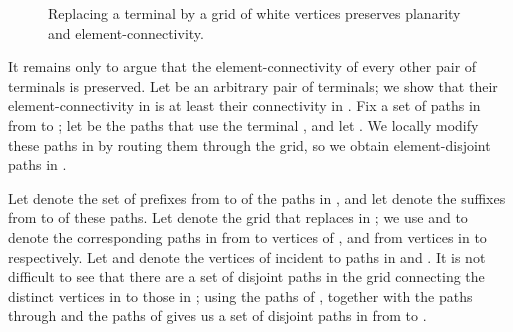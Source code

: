 \documentclass[11pt]{article}
\newenvironment{proofsketch}{\vspace{-0.1in}\noindent{\bf Proof Sketch:}}{\hspace*{\fill}\par}
\begin{document}
\begin{proofsketch}
\begin{figure}
\begin{center}
    \end{center}
    \caption{Replacing a terminal by a grid of white vertices
      preserves planarity and element-connectivity.} \label{fig:grid}
  \end{figure}

  It remains only to argue that the element-connectivity of every
  other pair of terminals is preserved. Let  be an arbitrary pair
  of terminals; we show that their element-connectivity in  is at
  least their connectivity  in . Fix a set of
   paths in  from  to ; let  be the
  paths that use the terminal , and let . We
  locally modify these  paths in  by routing them through
  the grid, so we obtain  element-disjoint paths in
  .

  Let  denote the set of prefixes from  to  of the
   paths in , and let  denote the
  suffixes from  to  of these paths. Let  denote the  grid that replaces  in ; we use  and
   to denote the corresponding paths in  from 
  to vertices of , and from vertices in  to  respectively.
  Let  and  denote the vertices of 
  incident to paths in  and .  It is not
  difficult to see that there are a set of disjoint paths in the grid
   connecting the  distinct vertices in  to those
  in ; using the paths of , together with
  the paths through  and the paths of  gives us a
  set of disjoint paths in  from  to .
\end{proofsketch}

\iffalse
To extend this algorithm to graphs of genus , we simply need a
Lemma analogous to Lemma~\ref{lem:parallelEdges}; that is, we need to
show that if  is the multigraph of the reduced instance (in which
we removed white vertices of degree 2), and  the graph of genus
 in which we keep only a single copy of each edge of , some
terminal  has low degree in .
\fi
\end{document}
